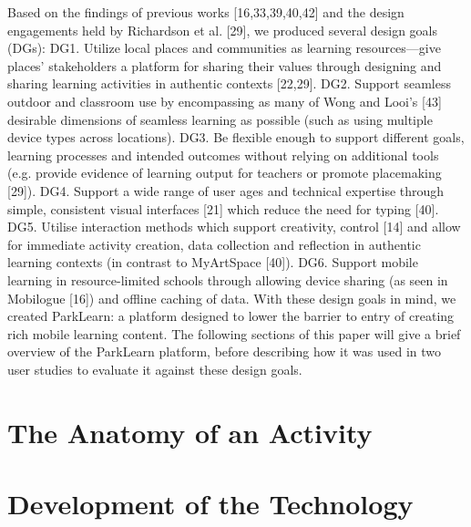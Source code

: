 Based on the findings of previous works [16,33,39,40,42] and the design engagements held by Richardson et al. [29], we produced several design goals (DGs):
DG1.	Utilize local places and communities as learning resources—give places’ stakeholders a platform for sharing their values through designing and sharing learning activities in authentic contexts [22,29].
DG2.	Support seamless outdoor and classroom use by encompassing as many of Wong and Looi’s [43] desirable dimensions of seamless learning as possible (such as using multiple device types across locations).
DG3.	Be flexible enough to support different goals, learning processes and intended outcomes without relying on additional tools (e.g. provide evidence of learning output for teachers or promote placemaking [29]).
DG4.	Support a wide range of user ages and technical expertise through simple, consistent visual interfaces [21] which reduce the need for typing [40].
DG5.	Utilise interaction methods which support creativity, control [14] and allow for immediate activity creation, data collection and reflection in authentic learning contexts (in contrast to MyArtSpace [40]).
DG6.	Support mobile learning in resource-limited schools through allowing device sharing (as seen in Mobilogue [16]) and offline caching of data.
With these design goals in mind, we created ParkLearn: a platform designed to lower the barrier to entry of creating rich mobile learning content.  The following sections of this paper will give a brief overview of the ParkLearn platform, before describing how it was used in two user studies to evaluate it against these design goals.

\section{The Anatomy of an Activity}
\label{sec:ActivityOverview}

\section{Development of the Technology}

